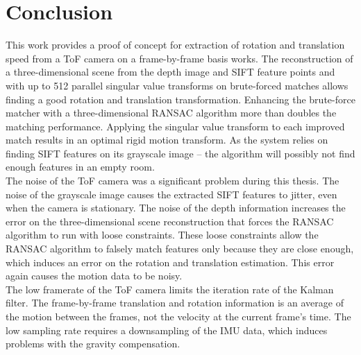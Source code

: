 \chapter{Conclusion}
\label{sec:Conclusion}
This work provides a proof of concept for extraction of rotation and translation speed from a ToF camera on a frame-by-frame basis works. The reconstruction of a three-dimensional scene from the depth image and SIFT feature points and with up to 512 parallel singular value transforms on brute-forced matches allows finding a good rotation and translation transformation. Enhancing the brute-force matcher with a three-dimensional RANSAC algorithm more than doubles the matching performance. Applying the singular value transform to each improved match results in an optimal rigid motion transform. As the system relies on finding SIFT features on its grayscale image – the algorithm will possibly not find enough features in an empty room.\\
The noise of the ToF camera was a significant problem during this thesis. The noise of the grayscale image causes the extracted SIFT features to jitter, even when the camera is stationary. The noise of the depth information increases the error on the three-dimensional scene reconstruction that forces the RANSAC algorithm to run with loose constraints. These loose constraints allow the RANSAC algorithm to falsely match features only because they are close enough, which induces an error on the rotation and translation estimation. This error again causes the motion data to be noisy.\\
The low framerate of the ToF camera limits the iteration rate of the Kalman filter. The frame-by-frame translation and rotation information is an average of the motion between the frames, not the velocity at the current frame's time. The low sampling rate requires a downsampling of the IMU data, which induces problems with the gravity compensation.\\ 



